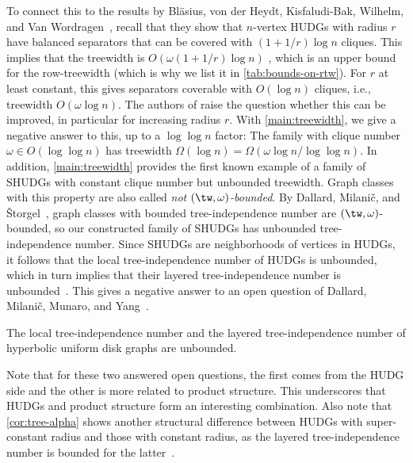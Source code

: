 %
To connect this to the results by Bläsius, von der Heydt, Kisfaludi-Bak, Wilhelm, and Van Wordragen~\cite{Struc_Indep_Hyper_Unifor_Disk_Graph-Blaesius25}, recall that they show that $ n $-vertex HUDGs with radius $ r $ have balanced separators that can be covered with $ (1 + 1/r) \log n $ cliques.
This implies that the treewidth is $ O(\omega (1 + 1/r) \log n) $ \cite{Treew_Graph_Balan_Separ-DvoraNorin19}, which is an upper bound for the row-treewidth (which is why we list it in \cref{tab:bounds-on-rtw}).
For $r$ at least constant, this gives separators coverable with $O(\log n)$ cliques, i.e., treewidth $ O(\omega \log n) $. 
The authors of \cite{Struc_Indep_Hyper_Unifor_Disk_Graph-Blaesius25} raise the question whether this can be improved, in particular for increasing radius $r$.
With \cref{main:treewidth}, we give a negative answer to this, up to a $\log\log n$ factor: The family with clique number $\omega \in O(\log\log n)$ has treewidth $\Omega(\log n) = \Omega(\omega \log n / \log\log n)$.
%
In addition, \cref{main:treewidth} provides the first known example of a family of SHUDGs with constant clique number but unbounded treewidth.
Graph classes with this property are also called \emph{not $ (\tw, \omega) $-bounded}.
%
By Dallard, Milanič, and Štorgel~\cite{dallard_tree-alpha_2024}, graph classes with bounded tree-independence number are $ (\tw, \omega) $-bounded, so our constructed family of SHUDGs has unbounded tree-independence number.
Since SHUDGs are neighborhoods of vertices in HUDGs, it follows that the local tree-independence number of HUDGs is unbounded, which in turn implies that their layered tree-independence number is unbounded~\cite{galby_local-tree-alpha_2024}.
This gives a negative answer to an open question of Dallard, Milanič, Munaro, and Yang~\cite{dallard_layered-tree-alpha_2025}.
%
\begin{corollary}\label{cor:tree-alpha}
    The local tree-independence number and the layered tree-independence number of hyperbolic uniform disk graphs are unbounded.
\end{corollary}
%
Note that for these two answered open questions, the first comes from the HUDG side and the other is more related to product structure.
This underscores that HUDGs and product structure form an interesting combination.
%
Also note that \cref{cor:tree-alpha} shows another structural difference between HUDGs with super-constant radius and those with constant radius, as the layered tree-independence number is bounded for the latter~\cite{dallard_layered-tree-alpha_2025}.
%
%
% 
%
%
%
%
%
%
%
